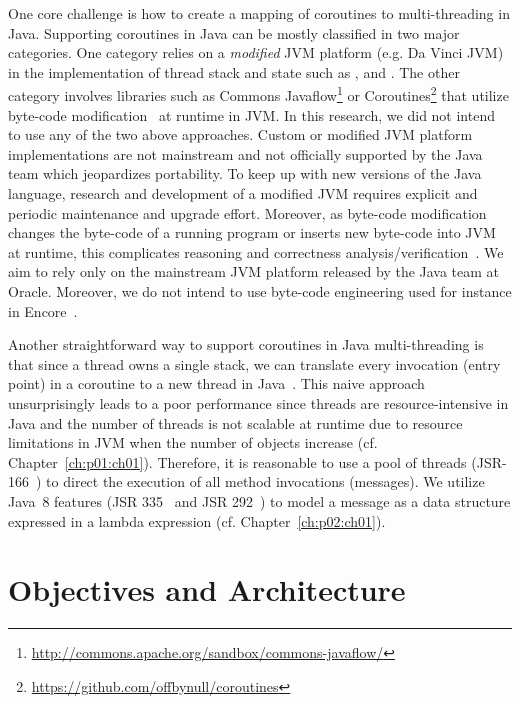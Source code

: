 One core challenge is how to create a mapping of coroutines to multi-threading in Java.
Supporting coroutines in Java can be mostly classified in two major categories.
One category relies on a \emph{modified} JVM platform (e.g. Da Vinci JVM) in the implementation of thread stack and state such as \cite{Stadler:2009:LCJ:1596655.1596679}, \cite{Stadler:2010:ECJ:1852761.1852765} and \cite{Liu:2006:II:1111320.1111063}.
The other category involves libraries such as Commons Javaflow\footnote{\url{http://commons.apache.org/sandbox/commons-javaflow/}} or Coroutines\footnote{\url{https://github.com/offbynull/coroutines}} that utilize byte-code modification~\cite{dahm1999byte} at runtime in JVM.
In this research, we did not intend to use any of the two above approaches.
Custom or modified JVM platform implementations are not mainstream and not officially supported by the Java team which jeopardizes portability.
To keep up with new versions of the Java language, research and development of a modified JVM requires explicit and periodic maintenance and upgrade effort.
Moreover, as byte-code modification changes the byte-code of a running program or inserts new byte-code into JVM at runtime, this complicates reasoning and correctness analysis/verification~\cite{leroy2001java,leroy2003java}.
We aim to rely only on the mainstream JVM platform released by the Java team at Oracle.
Moreover, we do not intend to use byte-code engineering used for instance in Encore~\cite{fernandez2015parallel}.

Another straightforward way to support coroutines in Java multi-threading is that since a thread owns a single stack, we can translate every invocation (entry point) in a coroutine to a new thread in Java~\cite{SchaferP10,schafer2010programming}. 
This naive approach unsurprisingly leads to a poor performance since threads are resource-intensive in Java and the number of threads is not scalable at runtime due to resource limitations in JVM when the number of objects increase (cf. Chapter~\ref{ch:p01:ch01}).
Therefore, it is reasonable to use a pool of threads (JSR-166~\cite{jsr166}) to direct the execution of all method invocations (messages). 
We utilize Java~8 features (JSR 335~\cite{jsr335} and JSR 292~\cite{jsr292:invokedyn}) to model a message as a data structure expressed in a lambda expression (cf. Chapter~\ref{ch:p02:ch01}).

\section{Objectives and Architecture}
\label{sec:intro:arch:crit}

